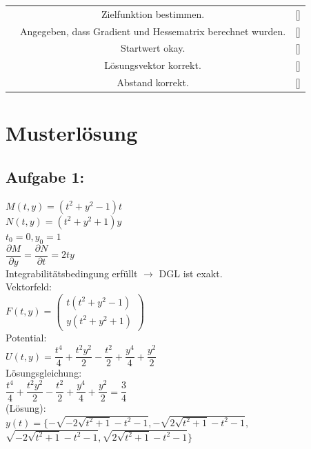 \documentclass[11pt,final]{scrreprt}
\begin{document}
\begin{tabular}{rcl}
 & Zielfunktion bestimmen. & [\hspace*{0.3cm}] \\ 
 & Angegeben, dass Gradient und Hessematrix berechnet wurden. & [\hspace*{0.3cm}] \\ 
 & Startwert okay. & [\hspace*{0.3cm}] \\
 & Lösungsvektor korrekt. & [\hspace*{0.3cm}] \\ 
 & Abstand korrekt. & [\hspace*{0.3cm}] \\ 
\end{tabular}

\newpage
\section{Musterlösung}
\subsection{Aufgabe 1:}
$ M(t, y) = (t^2+y^2-1)t $\\
$ N(t, y) = (t^2+y^2+1)y $\\
$ t_0=0, y_0=1 $\\

$ \dfrac{\partial M}{\partial y} = \dfrac{\partial N}{\partial t} = 2ty $\\
Integrabilitätsbedingung erfüllt $\rightarrow$ DGL ist exakt.\\

Vektorfeld:\\
$ F(t, y) = \left(\begin{matrix}
t(t^2+y^2-1)\\ y(t^2+y^2+1)
\end{matrix}\right) $\\
Potential:\\
$U(t, y) = \dfrac{t^4}{4} + \dfrac{t^2y^2}{2} - \dfrac{t^2}{2} + \dfrac{y^4}{4} + \dfrac{y^2}{2}$\\

Lösungsgleichung:\\
$\dfrac{t^4}{4} + \dfrac{t^2y^2}{2} - \dfrac{t^2}{2} + \dfrac{y^4}{4} + \dfrac{y^2}{2} = \dfrac{3}{4}$\\

(Lösung):\\
$ y(t) = \{ -\sqrt{-2\sqrt{t^2+1}-t^2-1}, -\sqrt{2\sqrt{t^2+1}-t^2-1},$\\ \hspace*{2em} $\sqrt{-2\sqrt{t^2+1}-t^2-1}, \sqrt{2\sqrt{t^2+1}-t^2-1}\} $\\
\end{document}
